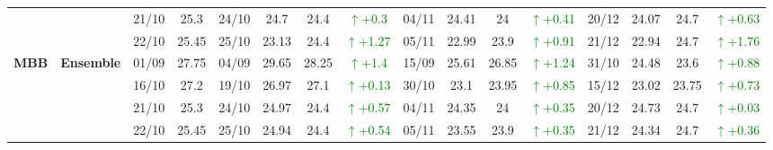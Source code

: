 \documentclass{ieeeaccess}
\begin{document}
{\begin{longtable}{llcc|cccc|cccc|cccc}
&
& 21/10 & 25.3 & 24/10 & 24.7 & 24.4 & \textcolor{green}{\(\uparrow\)+0.3} & 04/11 & 24.41 & 24 & \textcolor{green}{\(\uparrow\)+0.41} & 20/12 & 24.07 & 24.7 & \textcolor{green}{\(\uparrow\)+0.63} \\

&
& 22/10 & 25.45 & 25/10 & 23.13 & 24.4 & \textcolor{green}{\(\uparrow\)+1.27} & 05/11 & 22.99 & 23.9 & \textcolor{green}{\(\uparrow\)+0.91} & 21/12 & 22.94 & 24.7 & \textcolor{green}{\(\uparrow\)+1.76} \\
\midrule



\multirow{4}{*}{\textbf{MBB}} 
& \textbf{Ensemble}
& 01/09 & 27.75 & 04/09 & 29.65 & 28.25 & \textcolor{green}{\(\uparrow\)+1.4} & 15/09 & 25.61 & 26.85 & \textcolor{green}{\(\uparrow\)+1.24} & 31/10 & 24.48 & 23.6 & \textcolor{green}{\(\uparrow\)+0.88} \\

&
& 16/10 & 27.2 & 19/10 & 26.97 & 27.1 & \textcolor{green}{\(\uparrow\)+0.13} & 30/10 & 23.1 & 23.95 & \textcolor{green}{\(\uparrow\)+0.85} & 15/12 & 23.02 & 23.75 & \textcolor{green}{\(\uparrow\)+0.73} \\

&
& 21/10 & 25.3 & 24/10 & 24.97 & 24.4 & \textcolor{green}{\(\uparrow\)+0.57} & 04/11 & 24.35 & 24 & \textcolor{green}{\(\uparrow\)+0.35} & 20/12 & 24.73 & 24.7 & \textcolor{green}{\(\uparrow\)+0.03} \\

&
& 22/10 & 25.45 & 25/10 & 24.94 & 24.4 & \textcolor{green}{\(\uparrow\)+0.54} & 05/11 & 23.55 & 23.9 & \textcolor{green}{\(\uparrow\)+0.35} & 21/12 & 24.34 & 24.7 & \textcolor{green}{\(\uparrow\)+0.36} \\



\bottomrule
\end{longtable}
}







\clearpage
\onecolumn
\end{document}
